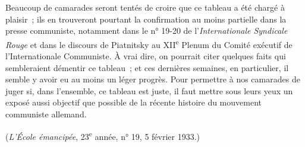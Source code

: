 \documentclass[french,twoside]{book} %
\begin{document}
Beaucoup de camarades seront tentés de croire que ce tableau a été chargé à plaisir ; ils en trouveront pourtant la confirmation au moins partielle dans la presse communiste, notamment dans le n° 19-20 de l'{\itshape Internationale Syndicale Rouge} et dans le discours de Piatnitsky au XII\textsuperscript{e} Plenum du Comité exécutif de l'Internationale Communiste. À vrai dire, on pourrait citer quelques faits qui sembleraient démentir ce tableau ; et ces dernières semaines, en particulier, il semble y avoir eu au moins un léger progrès. Pour permettre à nos camarades de juger si, dans l'ensemble, ce tableau est juste, il faut mettre sous leurs yeux un exposé aussi objectif que possible de la récente histoire du mouvement communiste allemand.\par
({\itshape L'École émancipée}, 23\textsuperscript{e} année, n° 19, 5 février 1933.)
\end{document}
